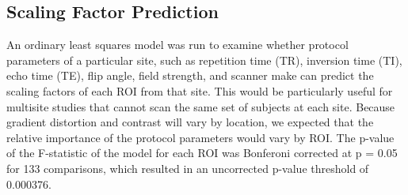 \subsection{Scaling Factor Prediction}

An ordinary least squares model was run to examine whether protocol parameters of a particular site, such as repetition time (TR), inversion time (TI), echo time (TE), flip angle, field strength, and scanner make can predict the scaling factors of each ROI from that site. This would be particularly useful for multisite studies that cannot scan the same set of subjects at each site. Because gradient distortion and contrast will vary by location, we expected that the relative importance of the protocol parameters would vary by ROI. The p-value of the F-statistic of the model for each ROI was Bonferoni corrected at p = 0.05 for 133 comparisons, which resulted in an uncorrected p-value threshold of 0.000376.